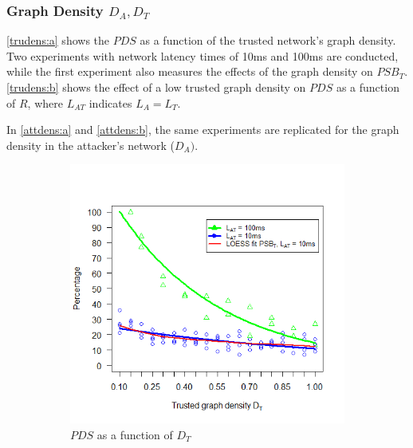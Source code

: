 \documentclass[a4paper,12pt,twoside]{report}
\begin{document}
\subsubsection{Graph Density $D_{A},D_T$}
\autoref{trudens:a} shows the $PDS$ as a function of the trusted network's graph density. Two experiments with network latency times of 10ms and 100ms are conducted, while the first experiment also measures the effects of the graph density on $PSB_T$. \autoref{trudens:b} shows the effect of a low trusted graph density on $PDS$ as a function of $R$, where $L_{AT}$ indicates $L_{A} = L_{T}$.

In \autoref{attdens:a} and \autoref{attdens:b}, the same experiments are replicated for the graph density in the attacker's network ($D_{A})$.

\begin{figure}[!ht]
\centering
\begin{subfigure}{.5\textwidth}
  \centering
  \includegraphics[width=\linewidth]{Experiments/TruDensity/trudens.png}
  \caption{$PDS$ as a function of $D_{T}$}
  \label{trudens:a}
\end{subfigure}%
\begin{subfigure}{.5\textwidth}
  \centering

\end{subfigure}
\end{figure}
\end{document}
